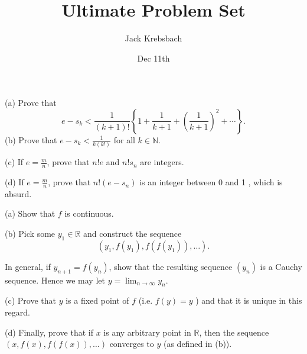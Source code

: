 \documentclass{report}
\title{Ultimate Problem Set}
\author{Jack Krebsbach }
\date{Dec 11th}
\begin{document}
\maketitle





(a) Prove that
$$
e-s_k<\frac{1}{(k+1) !}\left\{1+\frac{1}{k+1}+\left(\frac{1}{k+1}\right)^2+\cdots\right\} .
$$
(b) Prove that $e-s_k<\frac{1}{k(k!)}$ for all $k \in \mathbb{N}$.

\bigskip

(c) If $e=\frac{m}{n}$, prove that $n ! e$ and $n ! s_n$ are integers.

\bigskip
(d) If $e=\frac{m}{n}$, prove that $n!\left(e-s_n\right)$ is an integer between 0 and 1 , which is absurd.

\bigskip


(a) Show that $f$ is continuous.

\par

\bigskip
\bigskip
(b) Pick some $y_1 \in \mathbb{R}$ and construct the sequence
$$
\left(y_1, f\left(y_1\right), f\left(f\left(y_1\right)\right), \ldots\right) .
$$

In general, if $y_{n+1}=f\left(y_n\right)$, show that the resulting sequence $\left(y_n\right)$ is a Cauchy sequence. Hence we may let $y=\lim _{n \rightarrow \infty} y_n$.



\bigskip

\par
\bigskip
(c) Prove that $y$ is a fixed point of $f$ (i.e. $f(y)=y$ ) and that it is unique in this regard.

\par
\par
\bigskip
\bigskip
(d) Finally, prove that if $x$ is any arbitrary point in $\mathbb{R}$, then the sequence $(x, f(x), f(f(x)), \ldots)$ converges to $y$ (as defined in (b)).



\end{document}

